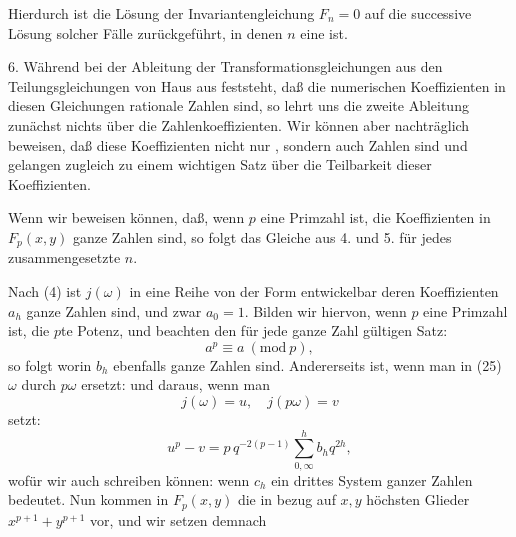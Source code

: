 Hierdurch ist die Lösung der Invariantengleichung $F_n = 0$ auf die successive Lösung solcher Fälle zurückgeführt, in denen $n$ eine  ist.

6. Während bei der Ableitung der Transformationsgleichungen aus den Teilungsgleichungen von Haus aus feststeht, daß die numerischen Koeffizienten in diesen Gleichungen rationale Zahlen sind, so lehrt uns die zweite Ableitung zunächst nichts über die Zahlenkoeffizienten. Wir können aber nachträglich beweisen, daß diese Koeffizienten nicht nur , sondern auch  Zahlen sind und gelangen zugleich zu einem wichtigen Satz über die Teilbarkeit dieser Koeffizienten.

Wenn wir beweisen können, daß, wenn $p$ eine Primzahl ist, die Koeffizienten in $F_p(x, y)$ ganze Zahlen sind, so folgt das Gleiche aus 4. und 5. für jedes zusammengesetzte $n$.

Nach (4) ist $j(\omega)$ in eine Reihe von der Form entwickelbar
deren Koeffizienten $a_h$ ganze Zahlen sind, und zwar $a_0 = 1$.
Bilden wir hiervon, wenn $p$ eine Primzahl ist, die $p$te Potenz, und beachten den für jede ganze Zahl gültigen  Satz:
\[
a^p \equiv a\ (\mathrm{mod}\ p),
\]
so folgt
worin $b_h$ ebenfalls ganze Zahlen sind. Andererseits ist, wenn man in (25) $\omega$ durch $p\omega$ ersetzt:
und daraus, wenn man
\[
j(\omega) = u, \quad j(p\omega) = v
\]
setzt:
\[
u^p - v = p\, q^{-2(p-1)} \sum_{0,\infty}^{h} b_h q^{2h},
\]
wofür wir auch schreiben können:
wenn $c_h$ ein drittes System ganzer Zahlen bedeutet.
Nun kommen in $F_p(x, y)$ die in bezug auf $x, y$ höchsten Glieder $x^{p+1} + y^{p+1}$ vor, und wir setzen demnach
